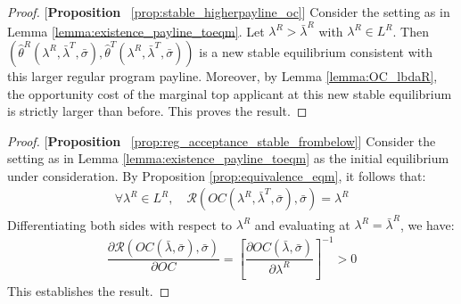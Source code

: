 \begin{proof}{[\textbf{Proposition} ~\ref{prop:stable_higherpayline_oc}]} Consider the setting as in Lemma \ref{lemma:existence_payline_toeqm}. Let $\lambda^R>\bar{\lambda}^R$ with $\lambda^R\in L^R$. Then $(\hat{\theta}^R(\lambda^R,\bar{\lambda}^T,\bar{\sigma}), \hat{\theta}^T(\lambda^R,\bar{\lambda}^T,\bar{\sigma}))$ is a new stable equilibrium consistent with this larger regular program payline. Moreover, by Lemma \ref{lemma:OC_lbdaR}, the opportunity cost of the marginal top applicant at this new stable equilibrium is strictly larger than before. This proves the result. 
\end{proof}





\begin{proof}{[\textbf{Proposition} ~\ref{prop:reg_acceptance_stable_frombelow}]}
Consider the setting as in Lemma \ref{lemma:existence_payline_toeqm} as the initial equilibrium under consideration. By Proposition \ref{prop:equivalence_eqm}, it follows that:
\begin{align*}
  \forall \lambda^R\in L^R,\quad \mathcal{R}(OC(\lambda^R,\bar{\lambda}^T,\bar{\sigma}),\bar{\sigma}) = \lambda^R
\end{align*}
Differentiating both sides with respect to $\lambda^R$ and evaluating at $\lambda^R = \bar{\lambda}^R$, we have:
\begin{align*}
    \dfrac{\partial \mathcal{R}(OC(\bar{\lambda},\bar{\sigma}),\bar{\sigma})}{\partial OC} = \left[\dfrac{\partial OC(\bar{\lambda},\bar{\sigma})}{\partial \lambda^R}\right]^{-1} >0
\end{align*}
This establishes the result. 
\end{proof}


